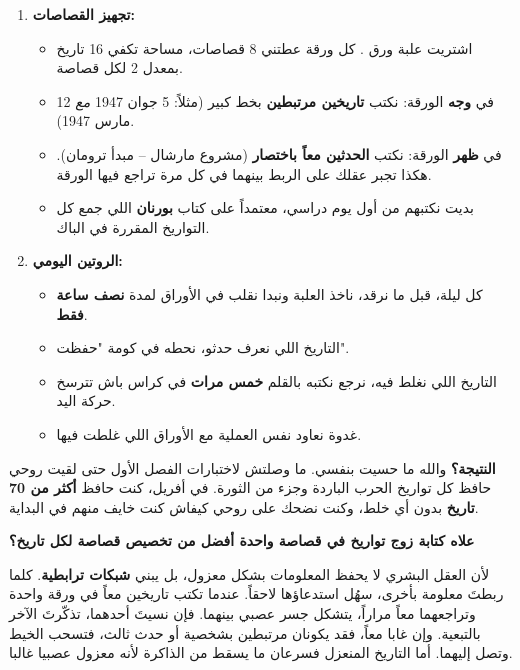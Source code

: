 \documentclass[12pt,a4paper]{book}
\begin{document}
	\begin{enumerate}
		\item \textbf{تجهيز القصاصات:}
		\begin{itemize}
			\item اشتريت علبة ورق . كل ورقة عطتني 8 قصاصات، مساحة تكفي 16 تاريخ بمعدل 2 لكل قصاصة.
			\item في \textbf{وجه} الورقة: نكتب \textbf{تاريخين مرتبطين} بخط كبير (مثلاً: 5 جوان 1947 \textit{مع} 12 مارس 1947).
			\item في \textbf{ظهر} الورقة: نكتب \textbf{الحدثين معاً باختصار} (مشروع مارشال – مبدأ ترومان). هكذا تجبر عقلك على الربط بينهما في كل مرة تراجع فيها الورقة.
			\item بديت نكتبهم من أول يوم دراسي، معتمداً على كتاب \textbf{بورنان} اللي جمع كل التواريخ المقررة في الباك.
		\end{itemize}
		
		\item \textbf{الروتين اليومي:}
		\begin{itemize}
			\item كل ليلة، قبل ما نرقد، ناخذ العلبة ونبدا نقلب في الأوراق لمدة \textbf{نصف ساعة فقط}.
			\item التاريخ اللي نعرف حدثو، نحطه في كومة "حفظت".
			\item التاريخ اللي نغلط فيه، نرجع نكتبه بالقلم \textbf{خمس مرات} في كراس باش تترسخ حركة اليد.
			\item غدوة نعاود نفس العملية مع الأوراق اللي غلطت فيها.
		\end{itemize}
	\end{enumerate}
	
	\vspace{1em}
	\textbf{النتيجة؟} والله ما حسيت بنفسي. ما وصلتش لاختبارات الفصل الأول حتى لقيت روحي حافظ كل تواريخ الحرب الباردة وجزء من الثورة. في أفريل، كنت حافظ \textbf{أكثر من 70 تاريخ} بدون أي خلط، وكنت نضحك على روحي كيفاش كنت خايف منهم في البداية.
	
	\vspace{1em}
	\textbf{علاه كتابة زوج تواريخ في قصاصة واحدة أفضل من تخصيص قصاصة لكل تاريخ؟}
	
	لأن العقل البشري لا يحفظ المعلومات بشكل معزول، بل يبني \textbf{شبكات ترابطية}. كلما ربطتَ معلومة بأخرى، سهُل استدعاؤها لاحقاً. عندما تكتب تاريخين معاً في ورقة واحدة وتراجعهما معاً مراراً، يتشكل جسر عصبي بينهما. فإن نسيتَ أحدهما، تذكّرتَ الآخر بالتبعية. وإن غابا معاً، فقد يكونان مرتبطين بشخصية أو حدث ثالث، فتسحب الخيط وتصل إليهما. أما التاريخ المنعزل فسرعان ما يسقط من الذاكرة لأنه معزول عصبيا غالبا.
	
\end{document}
